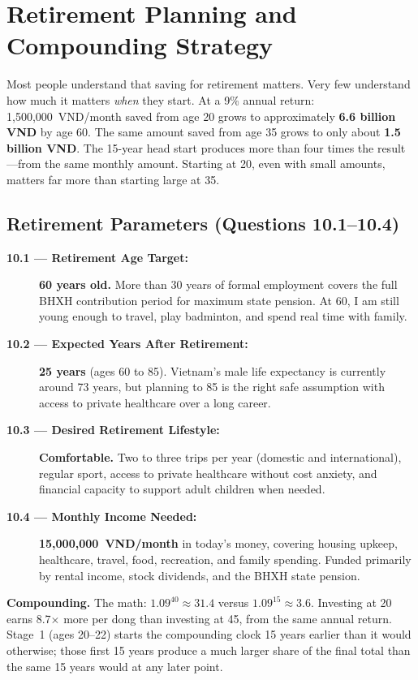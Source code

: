 \chapter{Retirement Planning and Compounding Strategy}

Most people understand that saving for retirement matters. Very few understand how much it matters \textit{when} they start. At a 9\% annual return: 1,500,000~VND/month saved from age 20 grows to approximately \textbf{6.6 billion VND} by age 60. The same amount saved from age 35 grows to only about \textbf{1.5 billion VND}. The 15-year head start produces more than four times the result---from the same monthly amount. Starting at 20, even with small amounts, matters far more than starting large at 35.

\section{Retirement Parameters (Questions 10.1--10.4)}

\begin{description}
  \item[\textbf{10.1 --- Retirement Age Target:}] \textbf{60 years old.} More than 30 years of formal employment covers the full BHXH contribution period for maximum state pension. At 60, I am still young enough to travel, play badminton, and spend real time with family.

  \item[\textbf{10.2 --- Expected Years After Retirement:}] \textbf{25 years} (ages 60 to 85). Vietnam's male life expectancy is currently around 73 years, but planning to 85 is the right safe assumption with access to private healthcare over a long career.

  \item[\textbf{10.3 --- Desired Retirement Lifestyle:}] \textbf{Comfortable.} Two to three trips per year (domestic and international), regular sport, access to private healthcare without cost anxiety, and financial capacity to support adult children when needed.

  \item[\textbf{10.4 --- Monthly Income Needed:}] \textbf{15,000,000~VND/month} in today's money, covering housing upkeep, healthcare, travel, food, recreation, and family spending. Funded primarily by rental income, stock dividends, and the BHXH state pension.
\end{description}

\textbf{Compounding.} The math: $1.09^{40} \approx 31.4$ versus $1.09^{15} \approx 3.6$. Investing at 20 earns 8.7$\times$ more per dong than investing at 45, from the same annual return. Stage~1 (ages 20--22) starts the compounding clock 15 years earlier than it would otherwise; those first 15 years produce a much larger share of the final total than the same 15 years would at any later point.

